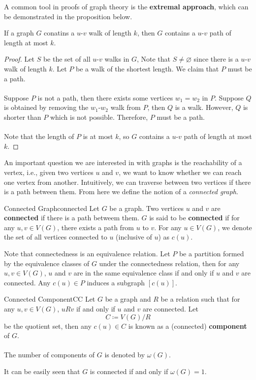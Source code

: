 \documentclass[math]{amznotes}
\theoremstyle{remark}
\begin{document}
A common tool in proofs of graph theory is the \textbf{extremal approach}, which can be demonstrated in the proposition below.
\begin{probox}{}{}
    If a graph $G$ conatins a $u$-$v$ walk of length $k$, then $G$ contains a $u$-$v$ path of length at most $k$.
    \tcblower
    \begin{proof}
        Let $S$ be the set of all $u$-$v$ walks in $G$, Note that $S \neq \varnothing$ since there is a $u$-$v$ walk of length $k$. Let $P$ be a walk of the shortest length. We claim that $P$ must be a path.
        \\\\
        Suppose $P$ is not a path, then there exists some vertices $w_1 = w_2$ in $P$. Suppose $Q$ is obtained by removing the $w_1$-$w_2$ walk from $P$, then $Q$ is a walk. However, $Q$ is shorter than $P$ which is not possible. Therefore, $P$ must be a path.
        \\\\
        Note that the length of $P$ is at most $k$, so $G$ contains a $u$-$v$ path of length at most $k$.
    \end{proof}
\end{probox}
An important question we are interested in with graphs is the reachability of a vertex, i.e., given two vertices $u$ and $v$, we want to know whether we can reach one vertex from another. Intuitively, we can traverse between two vertices if there is a path between them. From here we define the notion of a \textit{connected graph}.
\begin{dfnbox}{Connected Graph}{connected}
    Let $G$ be a graph. Two vertices $u$ and $v$ are {\color{red} \textbf{connected}} if there is a path betweem them. $G$ is said to be {\color{red} \textbf{connected}} if for any $u, v \in V(G)$, there exists a path from $u$ to $v$. For any $u \in V(G)$, we denote the set of all vertices connected to $u$ (inclusive of $u$) as $c(u)$.
\end{dfnbox}
Note that connectedness is an equivalence relation. Let $P$ be a partition formed by the equivalence classes of $G$ under the connectedness relation, then for any $u, v \in V(G)$, $u$ and $v$ are in the same equivalence class if and only if $u$ and $v$ are connected. Any $c(u) \in P$ induces a subgraph $[c(u)]$.
\begin{dfnbox}{Connected Component}{CC}
    Let $G$ be a graph and $R$ be a relation such that for any $u, v \in V(G)$, $uRv$ if and only if $u$ and $v$ are connected. Let
    \begin{equation*}
        C \coloneqq V(G)/R
    \end{equation*}
    be the quotient set, then any $c(u) \in C$ is known as a (connected) {\color{red} \textbf{component}} of $G$.
    \\\\
    The number of components of $G$ is denoted by $\omega(G)$.
\end{dfnbox}
It can be easily seen that $G$ is connected if and only if $\omega(G) = 1$.
\end{document}

